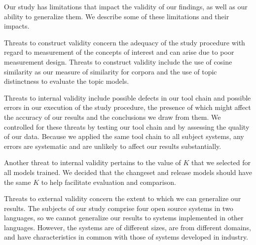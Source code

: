 
Our study has limitations that impact the validity of our findings,
as well as our ability to generalize them.
We describe some of these limitations and their impacts.

Threats to construct validity concern the adequacy of the study procedure with regard to
measurement of the concepts of interest and can arise due to poor measurement design.
Threats to construct validity include the use of cosine similarity as our measure of similarity for corpora
and the use of topic distinctness to evaluate the topic models.

Threats to internal validity include possible defects in our tool chain and possible errors
in our execution of the study procedure,
the presence of which might affect the accuracy of our results and the conclusions we draw from them.
We controlled for these threats by testing our tool chain and by assessing the quality of our data.
Because we applied the same tool chain to all subject systems, any errors are systematic and are unlikely
to affect our results substantially.

Another threat to internal validity pertains to the value of $K$ that we selected for all models trained.
We decided that the changeset and release models should have the same $K$
to help facilitate evaluation and comparison.

Threats to external validity concern the extent to which we can generalize our results.
The subjects of our study comprise four open source systems in two languages,
so we cannot generalize our results to systems implemented in other languages.
However, the systems are of different sizes, are from different domains, and
have characteristics in common with those of systems developed in industry.


